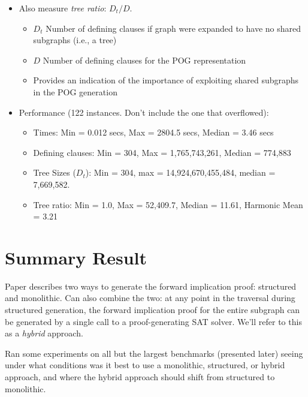 \documentclass[twoside,11pt]{article}
\begin{document}
\begin{enumerate}
\begin{itemize}
     \item Also measure \emph{tree ratio}: $D_t / D$.
       \begin{itemize}
       \item $D_t$ Number of defining clauses if graph were expanded to have no shared subgraphs (i.e., a tree)
       \item $D$ Number of defining clauses for the POG representation
       \item Provides an indication of the importance of exploiting shared subgraphs in the POG generation
       \end{itemize}

     \item Performance (122 instances.  Don't include the one that overflowed):
       \begin{itemize}
       \item Times: Min = 0.012 secs, Max = 2804.5 secs, Median = 3.46 secs
       \item Defining clauses: Min = 304, Max = 1,765,743,261, Median = 774,883
       \item Tree Sizes ($D_t$): Min = 304, max = 14,924,670,455,484, median = 7,669,582.
       \item Tree ratio: Min = 1.0, Max = 52,409.7, Median = 11.61, Harmonic Mean = 3.21
       \end{itemize}
     \end{itemize}
\end{enumerate}

\section*{Summary Result}

Paper describes two ways to generate the forward implication proof:
structured and monolithic.  Can also combine the two: at any point in
the traversal during structured generation, the forward implication
proof for the entire subgraph can be generated by a single call to a proof-generating
SAT solver.  We'll refer to this as a \emph{hybrid} approach.

Ran some experiments on all but the largest benchmarks (presented
later) seeing under what conditions was it best to use a monolithic,
structured, or hybrid approach, and where the hybrid approach should
shift from structured to monolithic.
\end{document}
